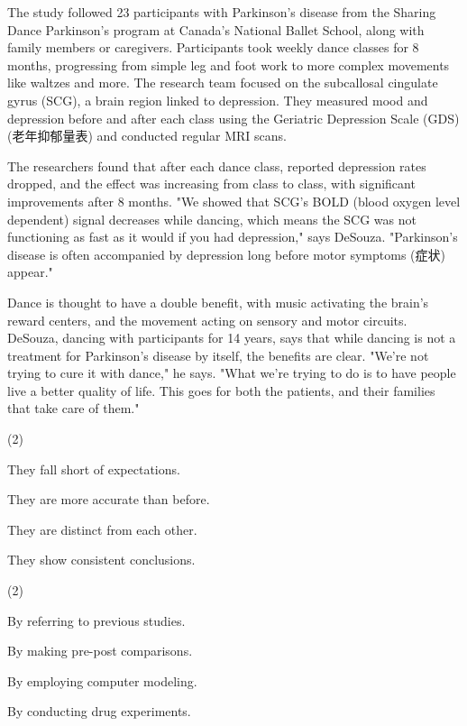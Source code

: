 \documentclass{英语试卷}
\begin{document}
\par The study followed 23 participants with Parkinson's disease from the Sharing Dance Parkinson's program at Canada's National Ballet School, along with family members or caregivers. Participants took weekly dance classes for 8 months, progressing from simple leg and foot work to more complex movements like waltzes and more. The research team focused on the subcallosal cingulate gyrus (SCG), a brain region linked to depression. They measured mood and depression before and after each class using the Geriatric Depression Scale (GDS) (老年抑郁量表) and conducted regular MRI scans.\par
\par The researchers found that after each dance class, reported depression rates dropped, and the effect was increasing from class to class, with significant improvements after 8 months. "We showed that SCG's BOLD (blood oxygen level dependent) signal decreases while dancing, which means the SCG was not functioning as fast as it would if you had depression," says DeSouza. "Parkinson’s disease is often accompanied by depression long before motor symptoms (症状) appear."\par
\par Dance is thought to have a double benefit, with music activating the brain's reward centers, and the movement acting on sensory and motor circuits. DeSouza, dancing with participants for 14 years, says that while dancing is not a treatment for Parkinson's disease by itself, the benefits are clear. "We're not trying to cure it with dance," he says. "What we're trying to do is to have people live a better quality of life. This goes for both the patients, and their families that take care of them."\par
{}
\begin{choices}(2)
  \item They fall short of expectations.
  \item They are more accurate than before.
  \item They are distinct from each other.
  \item They show consistent conclusions.
\end{choices}
\begin{choices}(2)
  \item By referring to previous studies.
  \item By making pre-post comparisons.
  \item By employing computer modeling.
  \item By conducting drug experiments.
\end{choices}
\end{document}
